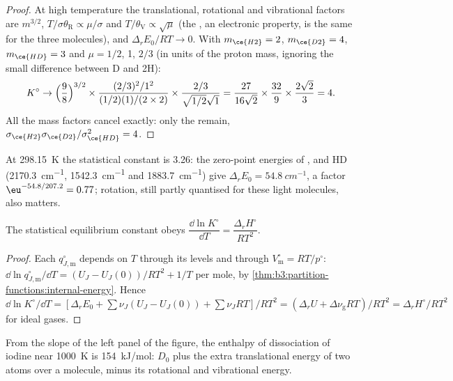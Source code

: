 \begin{proof}
At high temperature the translational, rotational and vibrational factors are
$m^{3/2}$, $T/\sigma\theta_{\mathrm R} \propto \mu/\sigma$ and $T/\theta_{\mathrm V} \propto \sqrt\mu$ (the , an
electronic property, is the same for the three molecules), and $\Delta_rE_0/RT \to 0$.
With $m_{\ce{H2}} = 2$, $m_{\ce{D2}} = 4$, $m_{\ce{HD}} = 3$ and $\mu = 1/2$, 1, $2/3$ (in units of the
proton mass, ignoring the small difference between D and 2H):
\[
  K^\circ \to \Bigl(\frac{9}{8}\Bigr)^{3/2} \times \frac{(2/3)^2/1^2}{(1/2)(1)/(2 \times 2)}
  \times \frac{2/3}{\sqrt{1/2}\sqrt1}
  = \frac{27}{16\sqrt2} \times \frac{32}{9} \times \frac{2\sqrt2}{3} = 4 .
\]
All the mass factors cancel exactly: only the  remain, $\sigma_{\ce{H2}}
\sigma_{\ce{D2}}/\sigma_{\ce{HD}}^2 = 4$.
\end{proof}

At \qty{298.15}{K} the statistical constant is 3.26: the zero-point energies of ,
 and HD (\qty{2170.3}{cm^{-1}}, \qty{1542.3}{cm^{-1}} and \qty{1883.7}{cm^{-1}}) give $\Delta_rE_0 =
\qty{54.8}{cm^{-1}}$, a factor $\eu^{-54.8/207.2} = 0.77$; rotation, still partly quantised for
these light molecules, also matters.

\begin{proposition}\label{prop:b3:statistical-thermo-applied:vant-hoff-stat}
The statistical equilibrium constant obeys $\dfrac{\dd\ln K^\circ}{\dd T} = \dfrac{\Delta_rH^\circ}{RT^2}$.
\end{proposition}

\begin{proof}
Each $q^\circ_{J,\mathrm m}$ depends on $T$ through its levels and through $V^\circ_{\mathrm m} = RT/p^\circ$:
$\dd\ln q^\circ_{J,\mathrm m}/\dd T = (U_J - U_J(0))/RT^2 + 1/T$ per mole, by
\cref{thm:b3:partition-functions:internal-energy}. Hence $\dd\ln K^\circ/\dd T =
[\Delta_rE_0 + \sum\nu_J(U_J - U_J(0)) + \sum\nu_JRT]/RT^2 = (\Delta_rU + \Delta\nu_{\mathrm g}RT)/RT^2 =
\Delta_rH^\circ/RT^2$ for ideal gases.
\end{proof}

From the slope of the left panel of the figure, the enthalpy of dissociation of
iodine near \qty{1000}{K} is \qty{154}{kJ/mol}: $D_0$ plus the extra translational
energy of two atoms over a molecule, minus its rotational and vibrational
energy.

